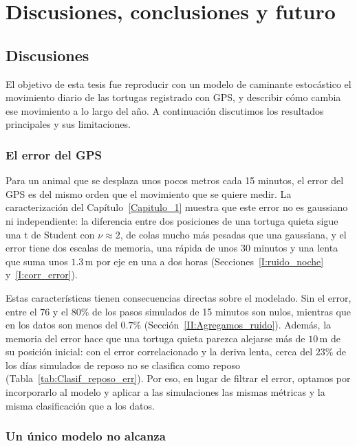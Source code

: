 \chapter{Discusiones, conclusiones y futuro}\label{Capitulo_4}
\chapterquote{}{}

\section{Discusiones}\label{IV:discusiones}

El objetivo de esta tesis fue reproducir con un modelo de caminante estocástico el movimiento diario de las tortugas registrado con GPS, y describir
cómo cambia ese movimiento a lo largo del año. A continuación discutimos los resultados principales y sus limitaciones.

\subsection{El error del GPS}

Para un animal que se desplaza unos pocos metros cada 15 minutos, el error del GPS es del mismo orden que el movimiento que se quiere medir. La
caracterización del Capítulo~\ref{Capitulo_1} muestra que este error no es gaussiano ni independiente: la diferencia entre dos posiciones de una tortuga
quieta sigue una t de Student con $\nu \approx 2$, de colas mucho más pesadas que una gaussiana, y el error tiene dos escalas de memoria, una rápida de
unos 30 minutos y una lenta que suma unos $1.3\,\mathrm{m}$ por eje en una a dos horas (Secciones~\ref{I:ruido_noche} y~\ref{I:corr_error}).

Estas características tienen consecuencias directas sobre el modelado. Sin el error, entre el $76$ y el $80 \%$ de los pasos simulados de 15 minutos
son nulos, mientras que en los datos son menos del $0.7 \%$ (Sección~\ref{II:Agregamos_ruido}). Además, la memoria del error hace que una tortuga quieta
parezca alejarse más de $10\,\mathrm{m}$ de su posición inicial: con el error correlacionado y la deriva lenta, cerca del $23 \%$ de los días simulados
de reposo no se clasifica como reposo (Tabla~\ref{tab:Clasif_reposo_err}). Por eso, en lugar de filtrar el error, optamos por incorporarlo al modelo y
aplicar a las simulaciones las mismas métricas y la misma clasificación que a los datos.

\subsection{Un único modelo no alcanza}

